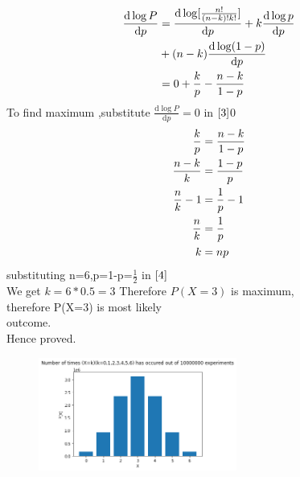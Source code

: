 \documentclass{assignment}
\begin{document}
\begin{paracol}{2}
\switchcolumn[1]
\begin{align}
\frac{\mathrm{d} \log P}{\mathrm{d} p}&=\frac{\mathrm{d} \log[\frac{n!}{(n-k)!k!}]}{\mathrm{d}p}+k \frac{\mathrm{d}\log p}{\mathrm{d} p} \notag \\
     &+(n-k) \frac{\mathrm{d}\log (1-p)}{\mathrm{d} p} \notag \\
     &=0+\frac{k}{p}-\frac{n-k}{1-p} \label{3}
\end{align}
To find maximum ,substitute $\frac{\mathrm{d} \log P}{\mathrm{d} p}=0$ in $\eqref{3}$0
\begin{align}
\frac{k}{p}&=\frac{n-k}{1-p} \notag \\
\frac{n-k}{k}&=\frac{1-p}{p} \notag \\
\frac{n}{k}-1&=\frac{1}{p}-1 \notag \\
\frac{n}{k}&=\frac{1}{p} \notag \\
k&=np \label{4}
\end{align}
\switchcolumn[0]
substituting n=6,p=1-p=$\frac{1}{2}$ in $\eqref{4}$\\
We get $k=6*0.5=3$
Therefore $P(X=3)$ is maximum,\\
therefore P(X=3) is most likely \\
outcome.\\
Hence proved.
\switchcolumn[1]
\begin{figure}
\begin{center}
\includegraphics[width=0.58\textwidth]{assignment1.png}
\end{center}
\end{figure}




\end{paracol}
\end{document}
